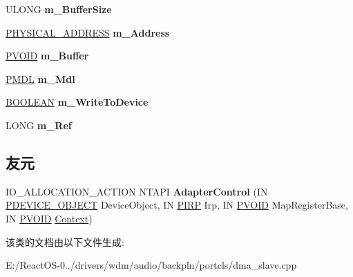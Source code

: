 \begin{DoxyCompactItemize}
\item 
\mbox{\label{class_c_dma_channel_init_a96763a6e256eef17d51e16243568c8b4}} 
U\+L\+O\+NG {\bfseries m\+\_\+\+Buffer\+Size}
\item 
\mbox{\label{class_c_dma_channel_init_a5e551da7cc5fc96c0337463cd7d26122}} 
\hyperlink{union___l_a_r_g_e___i_n_t_e_g_e_r}{P\+H\+Y\+S\+I\+C\+A\+L\+\_\+\+A\+D\+D\+R\+E\+SS} {\bfseries m\+\_\+\+Address}
\item 
\mbox{\label{class_c_dma_channel_init_aa4092776e3b7291f9f85fbc19c9b9af2}} 
\hyperlink{interfacevoid}{P\+V\+O\+ID} {\bfseries m\+\_\+\+Buffer}
\item 
\mbox{\label{class_c_dma_channel_init_a72b3fb44658d8f029e7a2d6779740fd0}} 
\hyperlink{interfacevoid}{P\+M\+DL} {\bfseries m\+\_\+\+Mdl}
\item 
\mbox{\label{class_c_dma_channel_init_acdab77bdf99a5ab9e5f778b3ebe08a26}} 
\hyperlink{_processor_bind_8h_a112e3146cb38b6ee95e64d85842e380a}{B\+O\+O\+L\+E\+AN} {\bfseries m\+\_\+\+Write\+To\+Device}
\item 
\mbox{\label{class_c_dma_channel_init_a6bc3714767eb76c0504344a42622489b}} 
L\+O\+NG {\bfseries m\+\_\+\+Ref}
\end{DoxyCompactItemize}
\subsection*{友元}
\begin{DoxyCompactItemize}
\item 
\mbox{\label{class_c_dma_channel_init_aa89634461dea0c890511cb6fe1ec186c}} 
I\+O\+\_\+\+A\+L\+L\+O\+C\+A\+T\+I\+O\+N\+\_\+\+A\+C\+T\+I\+ON N\+T\+A\+PI {\bfseries Adapter\+Control} (IN \hyperlink{struct___d_e_v_i_c_e___o_b_j_e_c_t}{P\+D\+E\+V\+I\+C\+E\+\_\+\+O\+B\+J\+E\+CT} Device\+Object, IN \hyperlink{interfacevoid}{P\+I\+RP} Irp, IN \hyperlink{interfacevoid}{P\+V\+O\+ID} Map\+Register\+Base, IN \hyperlink{interfacevoid}{P\+V\+O\+ID} \hyperlink{struct_context}{Context})
\end{DoxyCompactItemize}


该类的文档由以下文件生成\+:\begin{DoxyCompactItemize}
\item 
E\+:/\+React\+O\+S-\/0../drivers/wdm/audio/backpln/portcls/dma\+\_\+slave.\+cpp\end{DoxyCompactItemize}
